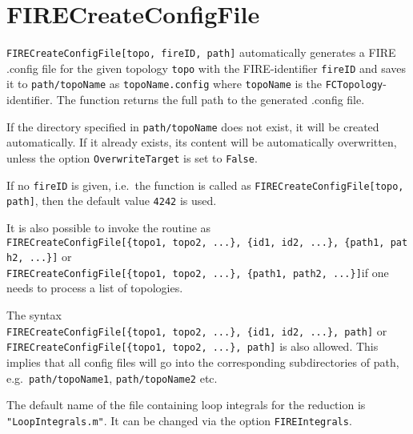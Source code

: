 \documentclass[../FeynHelpersManual.tex]{subfiles}
\begin{document}
\hypertarget{firecreateconfigfile}{
\section{FIRECreateConfigFile}\label{firecreateconfigfile}}

\texttt{FIRECreateConfigFile[\allowbreak{}topo,\ \allowbreak{}fireID,\ \allowbreak{}path]}
automatically generates a FIRE .config file for the given topology
\texttt{topo} with the FIRE-identifier \texttt{fireID} and saves it to
\texttt{path/topoName} as \texttt{topoName.config} where
\texttt{topoName} is the \texttt{FCTopology}-identifier. The function
returns the full path to the generated .config file.

If the directory specified in \texttt{path/topoName} does not exist, it
will be created automatically. If it already exists, its content will be
automatically overwritten, unless the option \texttt{OverwriteTarget} is
set to \texttt{False}.

If no \texttt{fireID} is given, i.e.~the function is called as
\texttt{FIRECreateConfigFile[\allowbreak{}topo,\ \allowbreak{} path]},
then the default value \texttt{4242} is used.

It is also possible to invoke the routine as
\texttt{FIRECreateConfigFile[\allowbreak{}\{\allowbreak{}topo1,\ \allowbreak{}topo2,\ \allowbreak{}...\},\ \allowbreak{}\{\allowbreak{}id1,\ \allowbreak{}id2,\ \allowbreak{}...\},\ \allowbreak{}\{\allowbreak{}path1,\ \allowbreak{}path2,\ \allowbreak{}...\}]}
or
\texttt{FIRECreateConfigFile[\allowbreak{}\{\allowbreak{}topo1,\ \allowbreak{}topo2,\ \allowbreak{}...\},\ \allowbreak{}\{\allowbreak{}path1,\ \allowbreak{}path2,\ \allowbreak{}...\}]}if
one needs to process a list of topologies.

The syntax
\texttt{FIRECreateConfigFile[\allowbreak{}\{\allowbreak{}topo1,\ \allowbreak{}topo2,\ \allowbreak{}...\},\ \allowbreak{}\{\allowbreak{}id1,\ \allowbreak{}id2,\ \allowbreak{}...\},\ \allowbreak{}path]}
or
\texttt{FIRECreateConfigFile[\allowbreak{}\{\allowbreak{}topo1,\ \allowbreak{}topo2,\ \allowbreak{}...\},\ \allowbreak{}path]}
is also allowed. This implies that all config files will go into the
corresponding subdirectories of path, e.g.~\texttt{path/topoName1},
\texttt{path/topoName2} etc.

The default name of the file containing loop integrals for the reduction
is \texttt{"LoopIntegrals.m"}. It can be changed via the option
\texttt{FIREIntegrals}.
\end{document}
